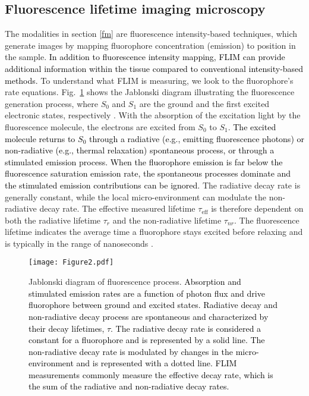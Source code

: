 \documentclass[12pt]{iopart}
\newcommand{\cc}[1]{\textcolor{black}{#1}}
\begin{document}
\subsection{Fluorescence lifetime imaging microscopy} \label{flim}
The modalities in section \ref{fm} are fluorescence intensity-based techniques, which generate images by mapping fluorophore concentration (emission) to position in the sample. \cc{In addition to fluorescence intensity mapping, FLIM can provide additional information within the tissue compared to conventional intensity-based methods.} To understand what FLIM is measuring, we look to the fluorophore's rate equations. Fig.~\ref{Jab_diag} shows the Jablonski diagram illustrating the fluorescence generation process, where $S_0$ and $S_1$ are the ground and the first excited electronic states, respectively \cite{FLIM2007}. With the absorption of the excitation light by the fluorescence molecule, the electrons are excited from $S_0$ to $S_1$. \cc{The excited molecule returns to $S_0$ through a radiative (e.g., emitting fluorescence photons) or non-radiative (e.g., thermal relaxation) spontaneous process, or through a stimulated emission process. When the fluorophore emission is far below the fluorescence saturation emission rate, the spontaneous processes dominate and the stimulated emission contributions can be ignored.} The radiative decay rate is generally constant, while the local micro-environment can modulate the non-radiative decay rate. The effective measured lifetime $\tau_{\mathrm{eff}}$ is therefore dependent on both the radiative lifetime $\tau_{r}$ and the non-radiative lifetime $\tau_{nr}$. The fluorescence lifetime indicates the average time a fluorophore stays excited before relaxing and is typically in the range of nanoseconds \cite{Confocal_Handbook, FluorescenceLifetimeMeasurements}.

\begin{figure}[!t]
	\centering
	\texttt{[image: Figure2.pdf]}
	\caption{Jablonski diagram of fluorescence process. \cc{Absorption and stimulated emission rates are a function of photon flux and drive fluorophore between ground and excited states. Radiative decay and non-radiative decay process are spontaneous and characterized by their decay lifetimes, $\tau$. The radiative decay rate is considered a constant for a fluorophore and is represented by a solid line. The non-radiative decay rate is modulated by changes in the micro-environment and is represented with a dotted line. FLIM measurements commonly measure the effective decay rate, which is the sum of the radiative and non-radiative decay rates.}}
	\label{Jab_diag}
\end{figure}
\end{document}
